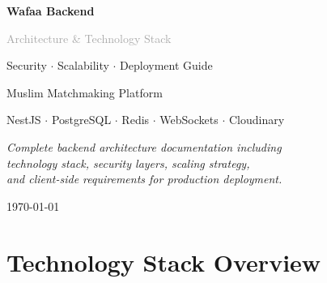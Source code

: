 \documentclass[a4paper,11pt]{article}
\begin{document}
\begin{titlepage}
\centering
\vspace*{3cm}
{\Huge\bfseries\textcolor{primary}{Wafaa Backend}\par}
\vspace{0.5cm}
{\LARGE\textcolor{darkgray}{Architecture \& Technology Stack}\par}
\vspace{0.3cm}
{\Large\textcolor{secondary}{Security $\cdot$ Scalability $\cdot$ Deployment Guide}\par}
\vspace{1.5cm}
{\large Muslim Matchmaking Platform\par}
\vspace{0.5cm}
{\large NestJS $\cdot$ PostgreSQL $\cdot$ Redis $\cdot$ WebSockets $\cdot$ Cloudinary\par}
\vspace{2cm}
\begin{tcolorbox}[colback=codebg,colframe=lightgray,width=0.8\textwidth]
\centering
\textit{Complete backend architecture documentation including\\technology stack, security layers, scaling strategy,\\and client-side requirements for production deployment.}
\end{tcolorbox}
\vfill
{\large \today\par}
\end{titlepage}

\tableofcontents
\newpage


\section{Technology Stack Overview}
\end{document}
